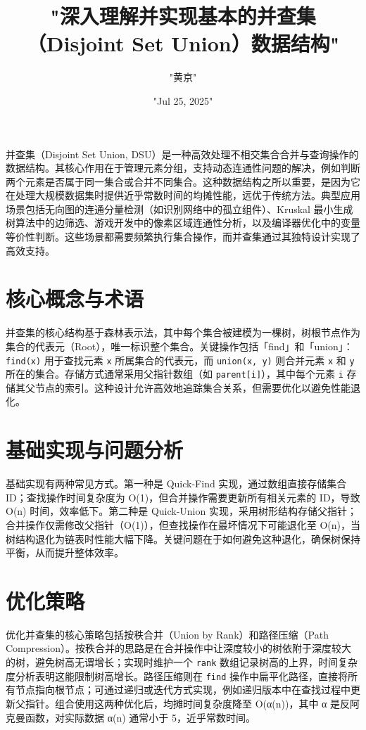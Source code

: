 \title{"深入理解并实现基本的并查集（Disjoint Set Union）数据结构"}
\author{"黄京"}
\date{"Jul 25, 2025"}
\maketitle
并查集（Disjoint Set Union, DSU）是一种高效处理不相交集合合并与查询操作的数据结构。其核心作用在于管理元素分组，支持动态连通性问题的解决，例如判断两个元素是否属于同一集合或合并不同集合。这种数据结构之所以重要，是因为它在处理大规模数据集时提供近乎常数时间的均摊性能，远优于传统方法。典型应用场景包括无向图的连通分量检测（如识别网络中的孤立组件）、Kruskal 最小生成树算法中的边筛选、游戏开发中的像素区域连通性分析，以及编译器优化中的变量等价性判断。这些场景都需要频繁执行集合操作，而并查集通过其独特设计实现了高效支持。\par
\chapter{核心概念与术语}
并查集的核心结构基于森林表示法，其中每个集合被建模为一棵树，树根节点作为集合的代表元（Root），唯一标识整个集合。关键操作包括「find」和「union」：\texttt{find(x)} 用于查找元素 \texttt{x} 所属集合的代表元，而 \texttt{union(x, y)} 则合并元素 \texttt{x} 和 \texttt{y} 所在的集合。存储方式通常采用父指针数组（如 \texttt{parent[i]}），其中每个元素 \texttt{i} 存储其父节点的索引。这种设计允许高效地追踪集合关系，但需要优化以避免性能退化。\par
\chapter{基础实现与问题分析}
基础实现有两种常见方式。第一种是 Quick-Find 实现，通过数组直接存储集合 ID；查找操作时间复杂度为 O(1)，但合并操作需要更新所有相关元素的 ID，导致 O(n) 时间，效率低下。第二种是 Quick-Union 实现，采用树形结构存储父指针；合并操作仅需修改父指针（O(1)），但查找操作在最坏情况下可能退化至 O(n)，当树结构退化为链表时性能大幅下降。关键问题在于如何避免这种退化，确保树保持平衡，从而提升整体效率。\par
\chapter{优化策略}
优化并查集的核心策略包括按秩合并（Union by Rank）和路径压缩（Path Compression）。按秩合并的思路是在合并操作中让深度较小的树依附于深度较大的树，避免树高无谓增长；实现时维护一个 \texttt{rank} 数组记录树高的上界，时间复杂度分析表明这能限制树高增长。路径压缩则在 \texttt{find} 操作中扁平化路径，直接将所有节点指向根节点；可通过递归或迭代方式实现，例如递归版本中在查找过程中更新父指针。组合使用这两种优化后，均摊时间复杂度降至 O(α(n))，其中 α 是反阿克曼函数，对实际数据 α(n) 通常小于 5，近乎常数时间。\par
